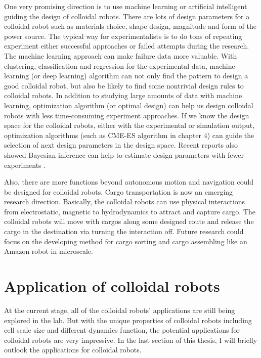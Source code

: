 One very promising  direction is to use machine learning or artificial intelligent guiding the design of colloidal robots. There are lots of design parameters for a colloidal robot such as materials choice, shape design, magnitude and form of the power source. The typical way for experimentalists is to do tons of repeating experiment either successful approaches or failed attempts during the research. The machine learning approach can make failure data more valuable. With clustering, classification and regression for the experimental data, machine learning (or deep learning) algorithm can not only find the pattern to design a good colloidal robot, but also be likely to find some nontrivial design rules to colloidal robots. In addition to studying large amounts of data with machine learning, optimization algorithm (or optimal design) can help us design colloidal robots with less time-consuming experiment approaches. If we know the design space for the colloidal robots, either with the experimental or simulation output, optimization algorithms (such as CME-ES algorithm in chapter 4) can guide the selection of next design parameters in the design space. Recent reports also showed Bayesian inference can help to estimate design parameters with fewer experiments \autocite{winslow2019characterization}.



Also, there are more functions beyond autonomous motion and navigation could be designed for colloidal robots. Cargo transportation is now an emerging research direction\autocite{demirors2018active,Martinez-Pedrero2015}. Basically, the colloidal robots can use physical interactions from electrostatic, magnetic to hydrodynamics to attract and capture cargo. The colloidal robots will move with cargos along some designed route and release the cargo in the destination via turning the interaction off. Future research could focus  on the developing method for cargo sorting and cargo assembling like an Amazon robot in microscale.


\section{Application of colloidal robots}
At the current stage, all of the colloidal robots' applications are still being explored in the lab. But with the unique properties of colloidal robots including cell scale size and different dynamics function, the potential applications for colloidal robots are very impressive. In the last section of this thesis, I will briefly outlook the applications for colloidal robots.

